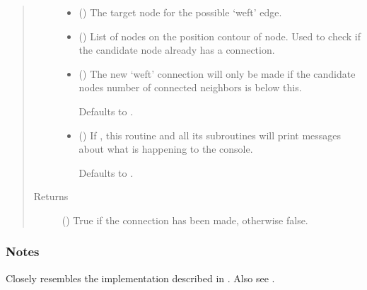 \documentclass[letterpaper,10pt,english]{sphinxmanual}
\begin{document}
\begin{fulllineitems}
\begin{fulllineitems}
\begin{quote}
\begin{description}
\begin{itemize}
\item {} 
 () \textendash{} The target node for the possible ‘weft’ edge.

\item {} 
 () \textendash{} List of nodes on the position contour of node. Used to check if
the candidate node already has a connection.

\item {} 
 (\sphinxstyleliteralemphasis{\sphinxupquote{, }}) \textendash{} 
The new ‘weft’ connection will only be made if the candidate nodes
number of connected neighbors is below this.

Defaults to .


\item {} 
 (\sphinxstyleliteralemphasis{\sphinxupquote{, }}) \textendash{} 
If , this routine and all its subroutines will print
messages about what is happening to the console.

Defaults to .


\end{itemize}

\item[{Returns}] \leavevmode
{} () \textendash{} True if the connection has been made, otherwise false.

\end{description}\end{quote}
\subsubsection*{Notes}

Closely resembles the implementation described in  \sphinxfootnotemark[1]. Also see
 \sphinxfootnotemark[2].


\end{fulllineitems}
\end{fulllineitems}
\end{document}
